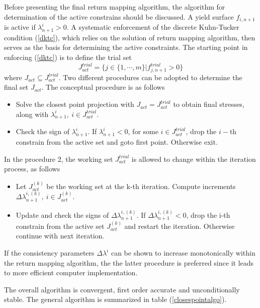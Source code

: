 \documentclass[a4paper]{article}
\begin{document}
Before presenting the final return mapping algorithm, the algorithm for determination of the active constrains should be discussed. A yield surface $f_{i,n+1}$ is active if $\lambda^i_{n+1} > 0$. A systematic enforcement of the discrete Kuhn-Tucker condition (\ref{dktc}), which relies on the solution of return mapping algorithm, then serves as the basis for determining the active constraints. The starting point in enforcing (\ref{dktc}) is to define the trial set
\begin{equation}
  J^{trial}_{act}=\{j\in\{1,\cdots,m\}|f^{trial}_{j,n+1} > 0\}
\end{equation}
where $J_{act}\subseteq J_{act}^{trial}$. Two different procedures can be adopted to determine the final set $J_{act}$. The conceptual procedure is as follows
\begin{itemize}
 \item
 Solve the closest point projection with $J_{act}=J_{act}^{trial}$ to obtain final stresses, along with $\lambda^i_{n+1},\ i\in J_{act}^{trial}$.
\item
Check the sign of $\lambda^i_{n+1}$. If $\lambda^i_{n+1} <0$, for some $i\in J_{act}^{trial}$, drop the $i-$th constrain from the active set and goto first point. Otherwise exit.
\end{itemize}

In the procedure 2, the working set $J_{act}^{trial}$ is allowed to change within the iteration process, as follows
\begin{itemize}
\item
Let $J_{act}^{(k)}$ be the working set at the k-th iteration. Compute increments $\Delta\lambda^{i,(k)}_{n+1},\ i\in J_{act}^{(k)}$.
\item
Update and check the signs of $\Delta\lambda^{i,(k)}_{n+1}$. If $\Delta\lambda^{i,(k)}_{n+1} < 0$, drop the i-th constrain from the active set $J_{act}^{(k)}$ and restart the iteration. Otherwise continue with next iteration.
\end{itemize}
If the consistency parameters $\Delta\lambda^{i}$ can be shown to increase monotonically within the return mapping algorithm, the the latter procedure is preferred since it leads to more efficient computer implementation.

The overall algorithm is convergent, first order accurate and unconditionally stable.
The general algorithm is summarized in table (\ref{closespointalgo}).
\end{document}
